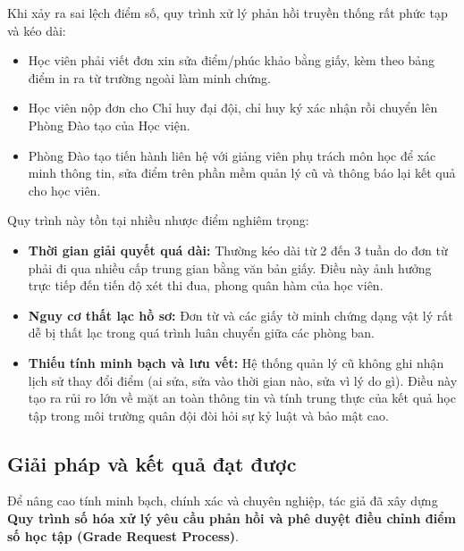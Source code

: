 \documentclass[../DoAn.tex]{subfiles}
\begin{document}
Khi xảy ra sai lệch điểm số, quy trình xử lý phản hồi truyền thống rất phức tạp và kéo dài:
\begin{itemize}
    \item Học viên phải viết đơn xin sửa điểm/phúc khảo bằng giấy, kèm theo bảng điểm in ra từ trường ngoài làm minh chứng.
    \item Học viên nộp đơn cho Chỉ huy đại đội, chỉ huy ký xác nhận rồi chuyển lên Phòng Đào tạo của Học viện.
    \item Phòng Đào tạo tiến hành liên hệ với giảng viên phụ trách môn học để xác minh thông tin, sửa điểm trên phần mềm quản lý cũ và thông báo lại kết quả cho học viên.
\end{itemize}

Quy trình này tồn tại nhiều nhược điểm nghiêm trọng:
\begin{itemize}
    \item \textbf{Thời gian giải quyết quá dài:} Thường kéo dài từ 2 đến 3 tuần do đơn từ phải đi qua nhiều cấp trung gian bằng văn bản giấy. Điều này ảnh hưởng trực tiếp đến tiến độ xét thi đua, phong quân hàm của học viên.
    \item \textbf{Nguy cơ thất lạc hồ sơ:} Đơn từ và các giấy tờ minh chứng dạng vật lý rất dễ bị thất lạc trong quá trình luân chuyển giữa các phòng ban.
    \item \textbf{Thiếu tính minh bạch và lưu vết:} Hệ thống quản lý cũ không ghi nhận lịch sử thay đổi điểm (ai sửa, sửa vào thời gian nào, sửa vì lý do gì). Điều này tạo ra rủi ro lớn về mặt an toàn thông tin và tính trung thực của kết quả học tập trong môi trường quân đội đòi hỏi sự kỷ luật và bảo mật cao.
\end{itemize}

\subsection{Giải pháp và kết quả đạt được}
\label{subsection:5.2.2}
Để nâng cao tính minh bạch, chính xác và chuyên nghiệp, tác giả đã xây dựng \textbf{Quy trình số hóa xử lý yêu cầu phản hồi và phê duyệt điều chỉnh điểm số học tập (Grade Request Process)}.
\end{document}

